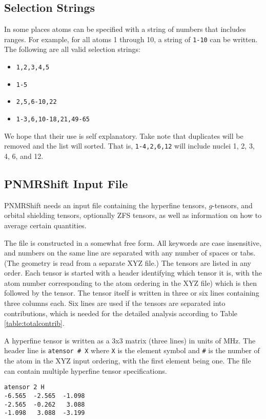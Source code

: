 \documentclass[11pt]{report}
\newcommand\PNMRShift{\textsf{PNMRShift}\xspace}
\newcommand{\code}[1]{\lstinline!#1!}
\begin{document}
\subsection{Selection Strings}
\label{sec:selection}
In some places atoms can be specified with a string of numbers that
includes ranges. For example, for all atoms 1 through 10,
a string of \code{1-10} can be written. The following are all
valid selection strings:
%
\begin{itemize}
\item[] \code{1,2,3,4,5}
\item[] \code{1-5}
\item[] \code{2,5,6-10,22}
\item[] \code{1-3,6,10-18,21,49-65}
\end{itemize}
%
We hope that their use is self explanatory. Take note that
duplicates will be removed and the list will sorted. That is,
\code{1-4,2,6,12} will include nuclei 1, 2, 3, 4, 6, and 12.


\subsection{\PNMRShift Input File}
\label{sec:pnmrinp}
\PNMRShift
needs an input file containing the hyperfine tensors,
$g$-tensors, and orbital shielding tensors, optionally ZFS tensors,
as well as information on how to average certain quantities.

The file is constructed in a somewhat free form.  All keywords are
case insensitive, and numbers on the same line are separated with any
number of spaces or tabs.  (The geometry is read from a separate XYZ
file.)  The tensors are listed in any order.  Each tensor is started
with a header identifying which tensor it is, with the atom number
corresponding to the atom ordering in the XYZ file) which is then
followed by the tensor. The tensor itself is written in three or six
lines containing three columns each. Six lines are used if the tensors
are separated into contributions, which is needed for the detailed
analysis according to Table \ref{table:totalcontrib}.

A hyperfine tensor is written as a 3x3 matrix (three lines) in
units of MHz.
The header line
is  \code{atensor # X} where \code{X} is the element symbol
and \code{#} is the number of the atom in the XYZ input ordering,
with the first element being one.
The file can contain multiple hyperfine tensor specifications.
%
\begin{lstlisting}[language={}]
atensor 2 H
-6.565  -2.565  -1.098
-2.565  -0.262   3.088
-1.098   3.088  -3.199
\end{lstlisting}
\end{document}
